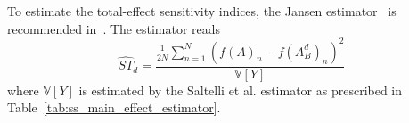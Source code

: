 To estimate the total-effect sensitivity indices, the Jansen estimator~\cite{Jansen1999} is recommended in~\cite{Saltelli2010a}.
The estimator reads
\begin{equation}
  \widehat{ST}_d = \frac{\frac{1}{2N}\sum_{n=1}^{N}\left(f(A)_n - f(A_B^d)_n\right)^2}{\mathbb{V}[Y]}
\label{eq:ss_jansen_estimator}
\end{equation}
where $\mathbb{V}[Y]$ is estimated by the Saltelli et al. estimator as prescribed in Table~\ref{tab:ss_main_effect_estimator}.
